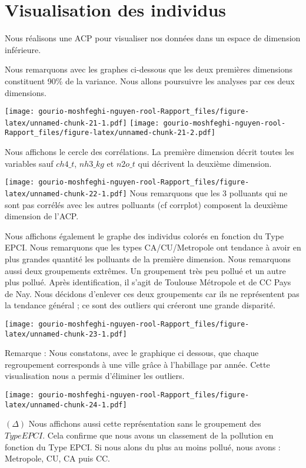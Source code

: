 \documentclass[
]{article}
\begin{document}
\hypertarget{visualisation-des-individus}{%
\section{Visualisation des
individus}\label{visualisation-des-individus}}

Nous réalisons une ACP pour visualiser nos données dans un espace de
dimension inférieure.

Nous remarquons avec les graphes ci-dessous que les deux premières
dimensions constituent 90\% de la variance. Nous allons poursuivre les
analyses par ces deux dimensions.

\texttt{[image: gourio-moshfeghi-nguyen-rool-Rapport\_files/figure-latex/unnamed-chunk-21-1.pdf]}
\texttt{[image: gourio-moshfeghi-nguyen-rool-Rapport\_files/figure-latex/unnamed-chunk-21-2.pdf]}

Nous affichons le cercle des corrélations. La première dimension décrit
toutes les variables sauf \(ch4\_t\), \(nh3\_kg\) et \(n2o\_t\) qui
décrivent la deuxième dimension.

\texttt{[image: gourio-moshfeghi-nguyen-rool-Rapport\_files/figure-latex/unnamed-chunk-22-1.pdf]}
Nous remarquons que les 3 polluants qui ne sont pas corrélés avec les
autres polluants (cf corrplot) composent la deuxième dimension de l'ACP.

Nous affichons également le graphe des individus colorés en fonction du
Type EPCI. Nous remarquons que les types CA/CU/Metropole ont tendance à
avoir en plus grandes quantité les polluants de la première dimension.
Nous remarquons aussi deux groupements extrêmes. Un groupement très peu
pollué et un autre plus pollué. Après identification, il s'agit de
Toulouse Métropole et de CC Pays de Nay. Nous décidons d'enlever ces
deux groupements car ils ne représentent pas la tendance général ; ce
sont des outliers qui créeront une grande disparité.

\texttt{[image: gourio-moshfeghi-nguyen-rool-Rapport\_files/figure-latex/unnamed-chunk-23-1.pdf]}

Remarque : Nous constatons, avec le graphique ci dessous, que chaque
regroupement corresponds à une ville grâce à l'habillage par année.
Cette visualisation nous a permis d'éliminer les outliers.

\texttt{[image: gourio-moshfeghi-nguyen-rool-Rapport\_files/figure-latex/unnamed-chunk-24-1.pdf]}

\((\Delta)\) Nous affichons aussi cette représentation sans le
groupement des \(TypeEPCI\). Cela confirme que nous avons un classement
de la pollution en fonction du Type EPCI. Si nous alons du plus au moins
pollué, nous avons : Metropole, CU, CA puis CC.
\end{document}
